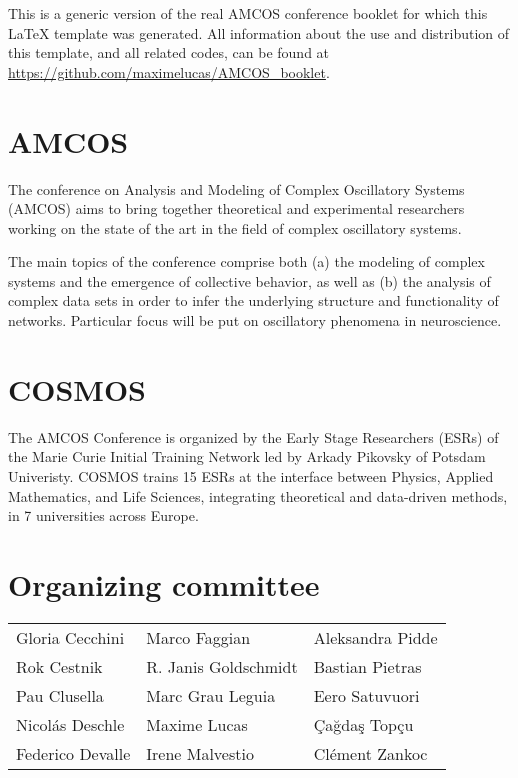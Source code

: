 {\small \textcolor{myblue}{This is a generic version of the real AMCOS conference booklet for which this \LaTeX{} template was generated. All information about the use and distribution of this template, and all related codes, can be found at \url{https://github.com/maximelucas/AMCOS\_booklet}.}}

\section{AMCOS}
The conference on Analysis and Modeling of Complex Oscillatory Systems (AMCOS) aims to bring together theoretical and experimental researchers working on the state of the art in the field of complex oscillatory systems.

The main topics of the conference comprise both (a) the modeling of complex systems and the emergence of collective behavior, as well as (b) the analysis of complex data sets in order to infer the underlying structure and functionality of networks. Particular focus will be put on oscillatory phenomena in neuroscience.

\section{COSMOS}

The AMCOS Conference is organized by the Early Stage Researchers (ESRs) of the Marie Curie Initial Training Network led by Arkady Pikovsky of Potsdam Univeristy. COSMOS trains 15 ESRs at the interface between Physics, Applied Mathematics, and Life Sciences, integrating theoretical and data-driven methods, in 7 universities across Europe.

\section{Organizing committee}
\begin{center}
\begin{tabular}{lll}
Gloria Cecchini & Marco Faggian &  Aleksandra Pidde \\
Rok Cestnik & R. Janis Goldschmidt &  Bastian Pietras\\
 Pau Clusella  & Marc Grau Leguia & Eero Satuvuori \\
 Nicolás Deschle & Maxime Lucas   &  Çağdaş Topçu \\
Federico Devalle  & Irene Malvestio  & Clément Zankoc 
\end{tabular}
\end{center}